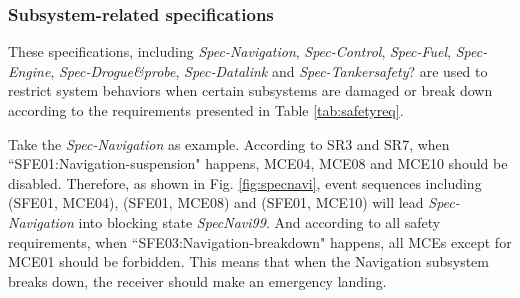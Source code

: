 \subsubsection{Subsystem-related specifications}
These specifications, including \textit{Spec-Navigation}, \textit{Spec-Control}, \textit{Spec-Fuel}, \textit{Spec-Engine}, \textit{Spec-Drogue\&probe}, \textit{Spec-Datalink} and \textit{Spec-Tankersafety}? are used to restrict system behaviors when certain subsystems are damaged or break down according to the requirements presented in Table \ref{tab:safetyreq}.

Take the \textit{Spec-Navigation} as example. According to SR3 and SR7, when ``SFE01:\allowbreak Navigation-suspension" happens, MCE04, MCE08 and MCE10 should be disabled. Therefore, as shown in Fig. \ref{fig:specnavi}, event sequences including (SFE01, MCE04), (SFE01, MCE08) and (SFE01, MCE10) will lead \textit{Spec-Navigation} into blocking state \textit{SpecNavi99}. And according to all safety requirements, when ``SFE03:Navigation-breakdown" happens, all MCEs except for MCE01 should be forbidden. This means that when the Navigation subsystem breaks down, the receiver should make an emergency landing.

